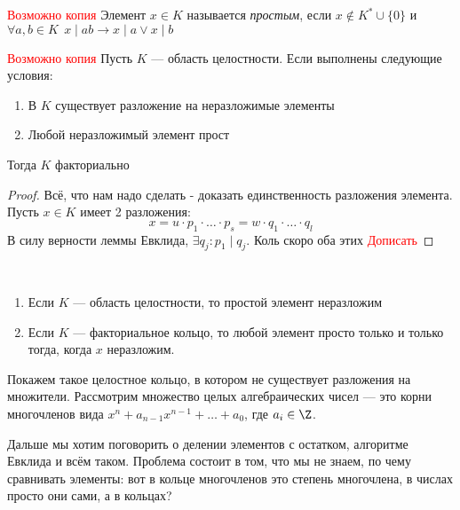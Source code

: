 \begin{definition} \textcolor{red}{Возможно копия}
	Элемент $x \in K$ называется \textit{простым}, если $x \notin K^* \cup \{0\}$ и $\forall a, b \in K\ \ x \mid ab \to x \mid a \vee x \mid b$
\end{definition}

\begin{theorem} \textcolor{red}{Возможно копия}
	Пусть $K$ --- область целостности. Если выполнены следующие условия:
	\begin{enumerate}
		\item В $K$ существует разложение на неразложимые элементы
		
		\item Любой неразложимый элемент прост
	\end{enumerate}
	Тогда $K$ факториально
\end{theorem}

\begin{proof}
	Всё, что нам надо сделать - доказать единственность разложения элемента. Пусть $x \in K$ имеет 2 разложения:
	\[
		x = u \cdot p_1 \cdot \ldots \cdot p_s = w \cdot q_1 \cdot \ldots \cdot q_l
	\]
	В силу верности леммы Евклида, $\exists q_j \colon p_1 \mid q_j$. Коль скоро оба этих 
	\textcolor{red}{Дописать}
\end{proof}

\begin{exercise}~
	\begin{enumerate}
		\item Если $K$ --- область целостности, то простой элемент неразложим
		
		\item Если $K$ --- факториальное кольцо, то любой элемент просто только и только тогда, когда $x$ неразложим.
	\end{enumerate}
\end{exercise}

\begin{example}
	Покажем такое целостное кольцо, в котором не существует разложения на множители. Рассмотрим множество целых алгебраических чисел --- это корни многочленов вида $x^n + a_{n - 1}x^{n - 1} + \ldots + a_0$, где $a_i \in \Z$.
\end{example}

\begin{note}
	Дальше мы хотим поговорить о делении элементов с остатком, алгоритме Евклида и всём таком. Проблема состоит в том, что мы не знаем, по чему сравнивать элементы: вот в кольце многочленов это степень многочлена, в числах просто они сами, а в кольцах?
\end{note}

